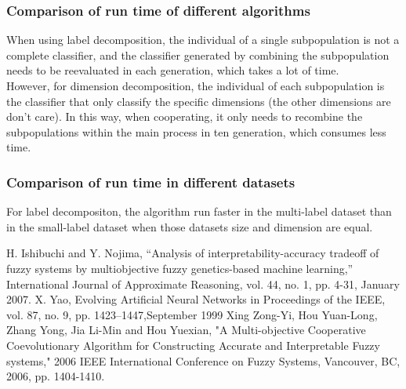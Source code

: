 \documentclass[conference,compsoc]{IEEEtran}
\begin{document}
\subsubsection{Comparison of run time of different algorithms}
\indent When using label decomposition, the individual of a single subpopulation is not a complete classifier, and the classifier generated by combining the subpopulation needs to be reevaluated in each generation, which takes a lot of time. \\
\indent However, for dimension decomposition, the individual of each subpopulation is the classifier that only classify the specific dimensions (the other dimensions are don't care). In this way, when cooperating, it only needs to recombine the subpopulations within the main process in ten generation, which consumes less time.
\subsubsection{Comparison of run time in different datasets}
\indent For label decompositon, the algorithm run faster in the multi-label dataset  than in the small-label dataset when those datasets size and dimension are equal.


\begin{thebibliography}{1}
H. Ishibuchi and Y. Nojima, “Analysis of interpretability-accuracy tradeoff of fuzzy systems by multiobjective fuzzy genetics-based machine learning,” International Journal of Approximate Reasoning, vol. 44, no. 1, pp. 4-31, January 2007.
X. Yao, Evolving Artificial Neural Networks in Proceedings of the IEEE, vol. 87, no. 9, pp. 1423–1447,September 1999
Xing Zong-Yi, Hou Yuan-Long, Zhang Yong, Jia Li-Min and Hou Yuexian, "A Multi-objective Cooperative Coevolutionary Algorithm for Constructing Accurate and Interpretable Fuzzy systems," 2006 IEEE International Conference on Fuzzy Systems, Vancouver, BC, 2006, pp. 1404-1410.


\end{thebibliography}











\end{document}
